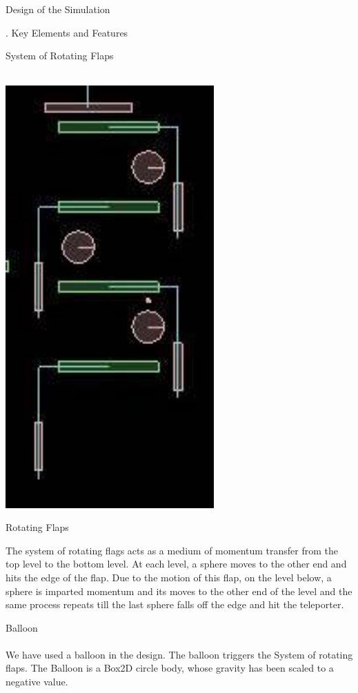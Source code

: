 \documentclass[a4paper,11pt]{resume}
\begin{document}
\begin{rSection}{{\heading Design of the Simulation}}
\begin{rSubsection}{{. Key Elements and Features}}{}{}{}
\begin{rSubsection}{{ System of Rotating Flaps}}{}{}{}
\\ \\
\begin{minipage}{0.15\textwidth}
\centering
\includegraphics[width=0.6\textwidth,scale=0.4]{flaps.jpg}
\label{fig:find}
\caption{Rotating Flaps}
\end{minipage}
\begin{minipage}{0.80\textwidth}
 The system of rotating flags acts as a medium of momentum transfer from the top level to the bottom level. At each level, a sphere moves to the other end and hits the edge of the flap. Due to the motion of this flap, on the level below, a sphere is imparted momentum and its moves to the other end of the level and the same process repeats till the last sphere falls off the edge and hit the teleporter.
 \end{minipage}
\end{rSubsection}

\begin{rSubsection}{{ Balloon}}{}{}{}
\\ \\
 We have used a balloon in the design. The balloon triggers the System of rotating flaps. The Balloon is a Box2D circle body, whose gravity has been scaled to a negative value.  
\end{rSubsection}


\end{rSubsection}
\end{rSection}
\end{document}
